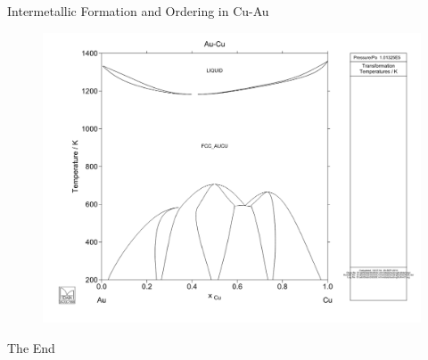 \documentclass[aspectratio=169]{beamer}
\begin{document}
\begin{frame}{Intermetallic Formation and Ordering in Cu-Au}
\begin{figure}
    \centering
    \includegraphics[width=0.6\linewidth]{lectures/figures/Lab_3-Cu_Au_PD.png}
\end{figure} 
\end{frame} 

%     
%     

\begin{frame}
    \Huge{\centerline{The End}}
\end{frame}
\end{document}
